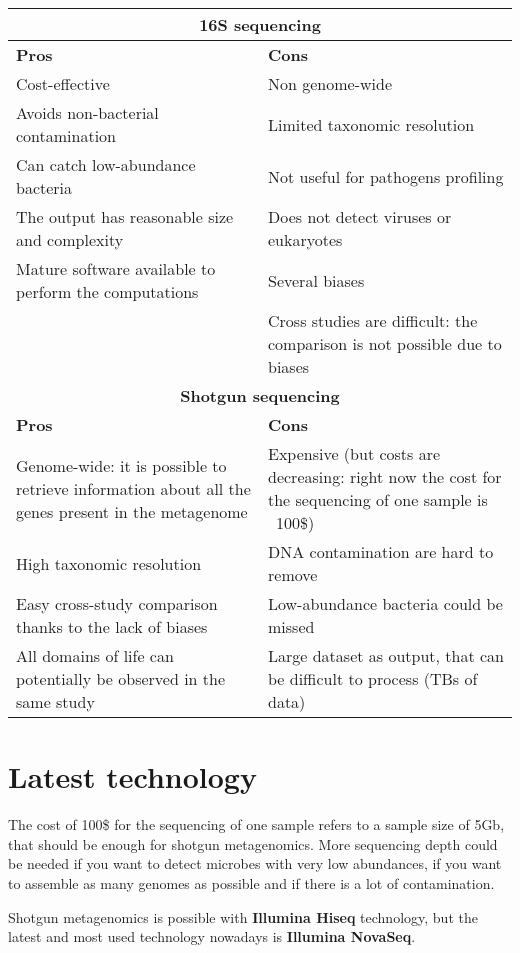\begin{tabular}{ | m{7cm}| m{7cm} | }
 \hline
 \multicolumn{2}{|c|}{\textbf{16S sequencing}} \\
 \hline
 \textbf{Pros} & \textbf{Cons} \\
 \hline
 Cost-effective & Non genome-wide \\
 Avoids non-bacterial contamination & Limited taxonomic resolution \\
 Can catch low-abundance bacteria & Not useful for pathogens profiling \\
 The output has reasonable size and complexity & Does not detect viruses or eukaryotes \\
 Mature software available to perform the computations & Several biases\\
 & Cross studies are difficult: the comparison is not possible due to biases \\
 \hline\hline
 \multicolumn{2}{|c|}{\textbf{Shotgun sequencing}} \\
 \hline
 \textbf{Pros} & \textbf{Cons} \\
 \hline
 Genome-wide: it is possible to retrieve information about all the genes present in the metagenome & Expensive (but costs are decreasing: right now the cost for the sequencing of one sample is ~100\$) \\
 High taxonomic resolution & DNA contamination are hard to remove \\
 Easy cross-study comparison thanks to the lack of biases & Low-abundance bacteria could be missed \\
 All domains of life can potentially be observed in the same study & Large dataset as output, that can be difficult to process (TBs of data) \\
 \hline
\end{tabular}

\section{Latest technology}

The cost of 100\$ for the sequencing of one sample refers to a sample size of 5Gb, that should be enough for shotgun metagenomics. More sequencing depth could be needed if you want to detect microbes with very low abundances, if you want to assemble as many genomes as possible and if there is a lot of contamination.

Shotgun metagenomics is possible with \textbf{Illumina Hiseq} technology, but the latest and most used technology nowadays is \textbf{Illumina NovaSeq}.

